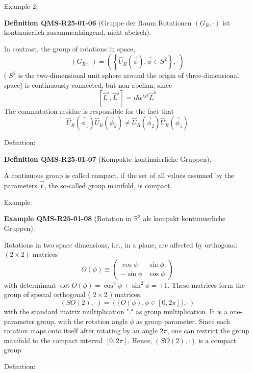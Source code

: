 \documentclass[10pt, letterpaper]{article}
\newcommand{\R}{\mathbb{R}}
\newcommand{\CustomHeading}[3]{%
  \par\medskip\noindent%
  \textbf{#1 #2} \textnormal{(#3)}.\enskip%
}
\newenvironment{DEF}[2]{\begin{unitbox}\CustomHeading{Definition}{#1}{#2}}{\end{unitbox}}
\newenvironment{EXA}[2]{\begin{unitbox}\CustomHeading{Example}{#1}{#2}}{\end{unitbox}}
\begin{document}
Example 2: 

\begin{DEF}{QMS-R25-01-06}{Gruppe der Raum Rotationen $(G_{R}, \cdot)$ ist kontinuierlich zusammenhängend, nicht abelsch}
In contrast, the group of rotations in space,
$$
\left(G_{R}, \cdot\right)=\left(\left\{\hat{U}_{R}(\vec{\phi}), \vec{\phi} \in S^{2}\right\}, \cdot\right)
$$
( $S^{2}$ is the two-dimensional unit sphere around the origin of three-dimensional space) is continuously connected, but non-abelian, since
$$
\left[\hat{L}^{i}, \hat{L}^{j}\right]=i \hbar \epsilon^{i j k} \hat{L}^{k}
$$
The commutation residue is responsible for the fact that
$$
\hat{U}_{R}\left(\vec{\phi}_{1}\right) \hat{U}_{R}\left(\vec{\phi}_{2}\right) \neq \hat{U}_{R}\left(\vec{\phi}_{2}\right) \hat{U}_{R}\left(\vec{\phi}_{1}\right)
$$
\end{DEF}



Definition: 

\begin{DEF}{QMS-R25-01-07}{Kompakte kontinuierliche Gruppen}
A continuous group is called compact, if the set of all values assumed by the parameters $\vec{t}$, the so-called group manifold, is compact.
\end{DEF}


Example: 

\begin{EXA}{QMS-R25-01-08}{Rotation in $\R^2$ als kompakt kontinuierliche Gruppen}
Rotations in two space dimensions, i.e., in a plane, are affected by orthogonal $(2 \times 2)$ matrices
$$
O(\phi) \equiv\left(\begin{array}{cc}
\cos \phi & \sin \phi \\
-\sin \phi & \cos \phi
\end{array}\right)
$$
with determinant $\operatorname{det} O(\phi)=\cos ^{2} \phi+\sin ^{2} \phi=+1$. These matrices form the group of special orthogonal ( $2 \times 2$ ) matrices,
$$
(S O(2), \cdot)=(\{O(\phi), \phi \in[0,2 \pi]\}, \cdot)
$$
with the standard matrix multiplication "." as group multiplication. It is a one-parameter group, with the rotation angle $\phi$ as group parameter. Since each rotation maps onto itself after rotating by an angle $2 \pi$, one can restrict the group manifold to the compact interval $[0,2 \pi]$. Hence, $(S O(2), \cdot)$ is a compact group.
\end{EXA}


Definition: 
\end{document}
